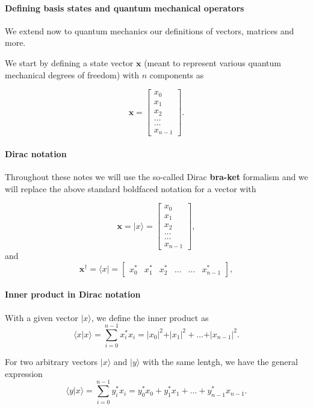 \paragraph{Defining basis states and quantum mechanical operators}

We extend now to quantum mechanics our definitions of vectors, matrices and more.

We start by defining a state vector $\bm{x}$ (meant to represent
various quantum mechanical degrees of freedom) with $n$ components as

\[
\bm{x} = \begin{bmatrix} x_0\\ x_1 \\ x_2 \\ \dots \\ \dots \\ x_{n-1} \end{bmatrix}.
\]


\paragraph{Dirac notation}

Throughout these notes we will use the so-called Dirac \textbf{bra-ket}
formalism and we will replace the above standard boldfaced notation
for a vector with

\[
\bm{x} = \vert x \rangle = \begin{bmatrix} x_0\\ x_1 \\ x_2 \\ \dots \\ \dots \\ x_{n-1} \end{bmatrix},
\]
and
\[
\bm{x}^{\dagger} = \langle x \vert = \begin{bmatrix} x_0^* & x_1^* & x_2^* & \dots & \dots & x_{n-1}^* \end{bmatrix},
\]


\paragraph{Inner product in Dirac notation}

With a given vector $\vert x \rangle$, we define the inner product as
\[
\langle x \vert x\rangle = \sum_{i=0}^{n-1} x_i^*x_i=\vert x_0\vert^2+\vert x_1\vert ^2+\dots + \vert x_{n-1}\vert^2. 
\]

For two arbitrary vectors $\vert x\rangle$ and $\vert y\rangle$ with the same lentgh, we have the
general expression
\[
\langle y \vert x\rangle = \sum_{i=0}^{n-1} y_i^*x_i=y_0^*x_0+y_1^*x_1+\dots + y_{n-1}^*x_{n-1}. 
\]


